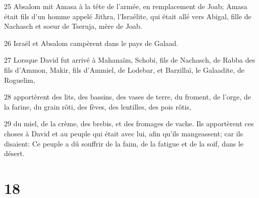 \par 25 Absalom mit Amasa à la tête de l'armée, en remplacement de Joab; Amasa était fils d'un homme appelé Jithra, l'Israélite, qui était allé vers Abigal, fille de Nachasch et soeur de Tseruja, mère de Joab.
\par 26 Israël et Absalom campèrent dans le pays de Galaad.
\par 27 Lorsque David fut arrivé à Mahanaïm, Schobi, fils de Nachasch, de Rabba des fils d'Ammon, Makir, fils d'Ammiel, de Lodebar, et Barzillaï, le Galaadite, de Roguelim,
\par 28 apportèrent des lits, des bassins, des vases de terre, du froment, de l'orge, de la farine, du grain rôti, des fèves, des lentilles, des pois rôtis,
\par 29 du miel, de la crème, des brebis, et des fromages de vache. Ils apportèrent ces choses à David et au peuple qui était avec lui, afin qu'ils mangeassent; car ils disaient: Ce peuple a dû souffrir de la faim, de la fatigue et de la soif, dans le désert.

\chapter{18}

